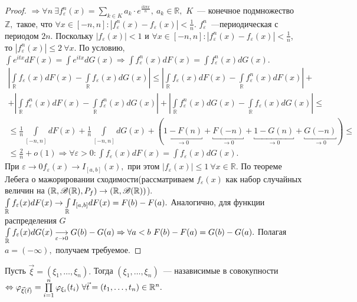 \begin{proof}
		\noindent \(\Rightarrow \forall n ~ \exists f_\varepsilon^n(x) = \sum\limits_{k \in K} a_k\cdot e^{\frac{ik\pi x}{n}}, ~a_k \in \mathbb{R},\) \(K\)~--- конечное подмножество \(\mathbb{Z},\) такое, что \(\forall x \in [-n, n]: |f_\varepsilon^n(x) - f_\varepsilon(x)| < \frac{1}{n}.\) \(f_\varepsilon^n\)~---периодическая с периодом \(2n.\) Поскольку \(|f_\varepsilon(x)| < 1\) и \(\forall x \in [-n, n]: |f_\varepsilon^n(x) - f_\varepsilon(x)| < \frac{1}{n}\), то \(|f_\varepsilon^n(x)| \leqslant 2 ~ \forall x.\) По условию, \(\int e^{itx}dF(x) = \int e^{itx}dG(x) \Rightarrow \int f_\varepsilon^n(x)dF(x) = \int f_\varepsilon^n(x)dG(x).\)
		\begin{gather*}
			\left|\int\limits_\mathbb{R} f_\varepsilon(x) dF(x) - \int\limits_\mathbb{R} f_\varepsilon(x)dG(x)\right| \leqslant \left|\int\limits_\mathbb{R} f_\varepsilon(x) dF(x) - \int\limits_\mathbb{R} f_\varepsilon^n(x) dF(x)\right| +\\
			+  \left|\int\limits_\mathbb{R} f_\varepsilon^n(x) dF(x) - \int\limits_\mathbb{R} f_\varepsilon^n(x) dG(x)\right| + \left|\int\limits_\mathbb{R} f_\varepsilon^n(x) dG(x) - \int\limits_\mathbb{R} f_\varepsilon(x) dG(x)\right| \leqslant\\
			\leqslant \frac{1}{n} \int\limits_{[-n,n]}dF(x) + \frac{1}{n} \int\limits_{[-n,n]}dG(x) +(\underbracket{1 - F(n)}_{\to 0} + \underbracket{F(-n)}_{\to 0} + \underbracket{1 - G(n)}_{\to 0} + \underbracket{G(-n)}_{\to 0}) \leqslant\\
			\leqslant \frac{2}{n} + o(1) \Rightarrow \forall \varepsilon> 0: \int f_\varepsilon(x) dF(x) = \int f_\varepsilon(x)dG(x).
		\end{gather*}
		При \(\varepsilon \to 0 f_\varepsilon(x) \to I_{[a,b]}(x),\) при этом \(|f_\varepsilon(x)| \leqslant 1~ \forall x \in \mathbb{R}.\) По теореме Лебега о мажорировании сходимости(рассматриваем \(f_\varepsilon(x)\) как набор случайных величин на \((\mathbb{R}, \mathscr{B}(\mathbb{R}), P_f) \to (\mathbb{R}, \mathscr{B}(\mathbb{R}))\)).
		\(\int\limits_{\mathbb{R}} f_\varepsilon(x)dF(x) \to \int\limits_{\mathbb{R}} I_{[a,b]}dF(x) = F(b) - F(a).\)
		Аналогично, для функции распределения \(G\) \(\int\limits_{\mathbb{R}} f_\varepsilon(x)dG(x) \underset{\varepsilon \to 0}{\longrightarrow} G(b) - G(a) \Rightarrow \forall a < b ~ F(b) - F(a) = G(b) - G(a).\)  Полагая \(a = (-\infty), \) получаем требуемое.
	\end{proof}

	\begin{theorem}
		Пусть \(\vec{\xi} = (\xi_1, \ldots, \xi_n).\) Тогда \((\xi_1, \ldots, \xi_n)\)~--- назависимые в совокупности \(\Leftrightarrow \varphi_{\vec{\xi}(\vec{t})} = \prod\limits_{i = 1}^n \varphi_{\xi_i}(t_i) ~\forall \vec{t} = (t_1, \ldots, t_n) \in \mathbb{R}^n.\)
	\end{theorem}

